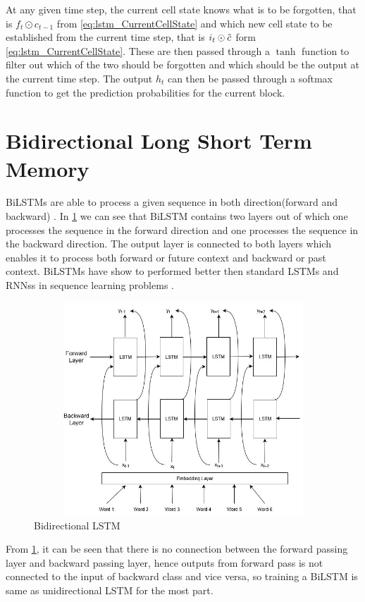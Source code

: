 At any given time step, the current cell state knows what is to be forgotten, that is $f_{t}\odot c_{t-1}$ from \ref{eq:lstm_CurrentCellState} and which new cell state to be established from the current time step, that is $i_{t}\odot \Tilde{c}$ form \ref{eq:lstm_CurrentCellState}. These are then passed through a $\tanh$ function to filter out which of the two should be forgotten and which should be the output at the current time step. The output $h_{t}$ can then be passed through a softmax function to get the prediction probabilities for the current block.


\section{Bidirectional Long Short Term Memory}
\glspl{BiLSTM} are able to process a given sequence in both direction(forward and backward) \cite{schuster1997bidirectional}. In \ref{fig:BiLSTM} we can see that \gls{BiLSTM} contains two layers out of which one processes the sequence in the forward direction and one processes the sequence in the backward direction. The output layer is connected to both layers which enables it to process both forward or future context and backward or past context. \glspl{BiLSTM} have show to performed better then standard \glspl{LSTM} and \glspl{RNN}s in sequence learning problems \cite{baldi2000bidirectional} \cite{fukada1999phoneme}.

\begin{figure}[!ht]
    \centering
    \includegraphics[width=12cm,height=8cm,keepaspectratio]{pics/BiLSTM.jpg}
    \captionsetup{justification=centering,margin=2cm}
    \caption{Bidirectional LSTM }
    \label{fig:BiLSTM}
\end{figure}

From \ref{fig:BiLSTM}, it can be seen that there is no connection between the forward passing layer and backward passing layer, hence outputs from forward pass is not connected to the input of backward class and vice versa, so training a \gls{BiLSTM} is same as unidirectional \gls{LSTM} for the most part.

